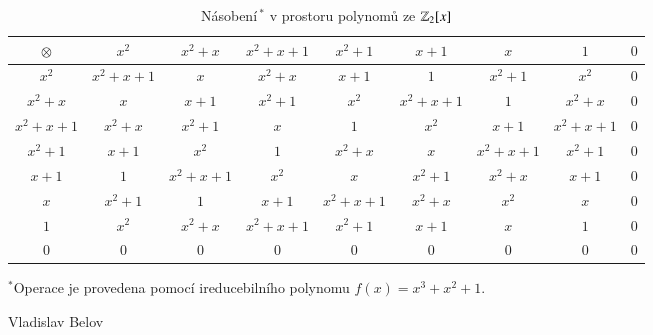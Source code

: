 \documentclass[11pt,american,czech]{article}
\begin{document}
\begin{table}[h]
\begin{threeparttable}
\caption{Násobení$\,^*$ v prostoru polynomů ze $\Bbb{Z}_{\small 2}[x]$}
\begin{tabular}{|c||c|c|c|c|c|c|c| C{2.5mm} |}
\hline
$\otimes$ & $x^2$ & $x^2+x$ & $x^2+x+1$ & $x^2+1$ & $x+1$ & $x$ & $1$ & $0$ \\ \hline \hline
$x^2$ & $x^2+x+1$ & $x$ & $x^2+x$ & $x+1$ & $1$ & $x^2+1$ & $x^2$ & $0$ \\ \hline
$x^2+x$ & $x$ & $x+1$ & $x^2+1$ & $x^2$ & $x^2+x+1$ & $1$ & $x^2+x$ & $0$ \\ \hline
$x^2+x+1$ & $x^2+x$ & $x^2+1$ & $x$ & $1$ & $x^2$ & $x+1$ & $x^2+x+1$ & $0$ \\ \hline
$x^2+1$ & $x+1$ & $x^2$ & $1$ & $x^2+x$ & $x$ & $x^2+x+1$ & $x^2+1$ & $0$ \\ \hline
$x+1$ & $1$ & $x^2+x+1$ & $x^2$ & $x$ & $x^2+1$ & $x^2+x$ & $x+1$ & $0$ \\ \hline
$x$ & $x^2+1$ & $1$ & $x+1$ & $x^2+x+1$ & $x^2+x$ & $x^2$ & $x$ & $0$ \\ \hline
$1$ & $x^2$ & $x^2+x$ & $x^2+x+1$ & $x^2+1$ & $x+1$ & $x$ & $1$ & $0$ \\ \hline
$0$ & $0$ & $0$ & $0$ & $0$ & $0$ & $0$ & $0$ & $0$ \\ \hline
\end{tabular} 
\begin{tablenotes}
      \scriptsize
      \item $^*$Operace je provedena pomocí ireducebilního polynomu $f(x)=x^3+x^2+1$.
    \end{tablenotes}
\end{threeparttable} 
\end{table}


\vfill
\begin{flushright}
Vladislav Belov
\end{flushright}
\pagebreak
\end{document}
